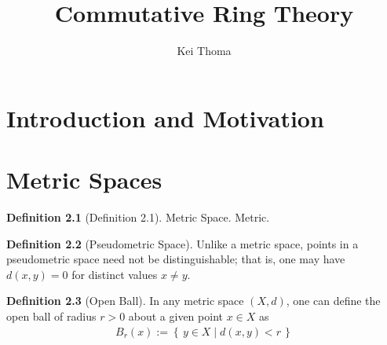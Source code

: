 \documentclass[a4paper]{book}
\title{Commutative Ring Theory}
\author{Kei Thoma}
\theoremstyle{definition}
\newtheorem{definition}{Definition}[]
\newcommand{\makeset}[2]{\left\{\, #1 \mid #2 \,\right\}}
\begin{document}
\maketitle
\tableofcontents
\chapter{Introduction and Motivation}
\chapter{Metric Spaces}

\begin{defbox}
    \begin{definition}[Definition 2.1]
        Metric Space. Metric.
    \end{definition}
\end{defbox}

\begin{defbox}
    \begin{definition}[Pseudometric Space]
        Unlike a metric space, points in a pseudometric space need not be distinguishable; that is, one may have \(d(x, y) = 0\) for distinct values \(x \neq y\).
    \end{definition}
\end{defbox}

\begin{defbox}
    \begin{definition}[Open Ball]
        In any metric space \((X, d)\), one can define the open ball of radius \(r > 0\) about a given point \(x \in X\) as
        \begin{align*}
            B_r(x) := \makeset{y \in X}{d(x, y) < r}
        \end{align*}
    \end{definition}
\end{defbox}
\end{document}
